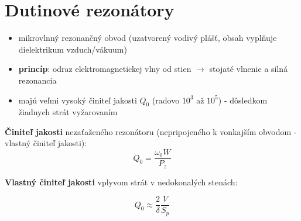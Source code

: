 	\section{Dutinové rezonátory} \label{rez:dutinove_rez}
	\begin{itemize}[label=--]
		\item mikrovlnný rezonančný obvod (uzatvorený vodivý plášť, obsah vyplňuje dielektrikum vzduch/vákuum)
		\item \textbf{princíp}: odraz elektromagnetickej vlny od stien $\rightarrow$ stojaté vlnenie a silná rezonancia
		\item majú veľmi vysoký činiteľ jakosti $Q_0$ (radovo $10^3$ až $10^5$) - dôsledkom žiadnych strát vyžarovaním
	\end{itemize}
	\textbf{Činiteľ jakosti} nezaťaženého rezonátoru (nepripojeného k vonkajším obvodom - vlastný činiteľ jakosti):
	\begin{equation}
		Q_0 = \frac{\omega_0 W}{P_z}
	\end{equation}
	{\raggedright \textbf{Vlastný činiteľ jakosti} vplyvom strát v nedokonalých stenách:}
	\begin{equation}
		Q_0 \approx \frac{2}{\delta}\frac{V}{S_p}
	\end{equation}
